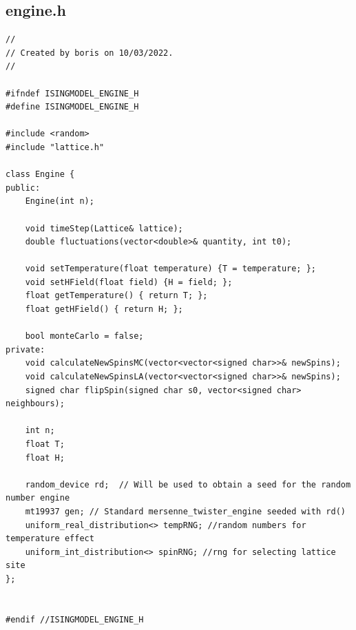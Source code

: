 \documentclass[a4paper, 12pt]{article}
\begin{document}
\subsection{engine.h}
\begin{lstlisting}
//
// Created by boris on 10/03/2022.
//

#ifndef ISINGMODEL_ENGINE_H
#define ISINGMODEL_ENGINE_H

#include <random>
#include "lattice.h"

class Engine {
public:
    Engine(int n);

    void timeStep(Lattice& lattice);
    double fluctuations(vector<double>& quantity, int t0);

    void setTemperature(float temperature) {T = temperature; };
    void setHField(float field) {H = field; };
    float getTemperature() { return T; };
    float getHField() { return H; };

    bool monteCarlo = false;
private:
    void calculateNewSpinsMC(vector<vector<signed char>>& newSpins);
    void calculateNewSpinsLA(vector<vector<signed char>>& newSpins);
    signed char flipSpin(signed char s0, vector<signed char> neighbours);

    int n;
    float T;
    float H;

    random_device rd;  // Will be used to obtain a seed for the random number engine
    mt19937 gen; // Standard mersenne_twister_engine seeded with rd()
    uniform_real_distribution<> tempRNG; //random numbers for temperature effect
    uniform_int_distribution<> spinRNG; //rng for selecting lattice site
};


#endif //ISINGMODEL_ENGINE_H
\end{lstlisting}

\newpage
\end{document}
